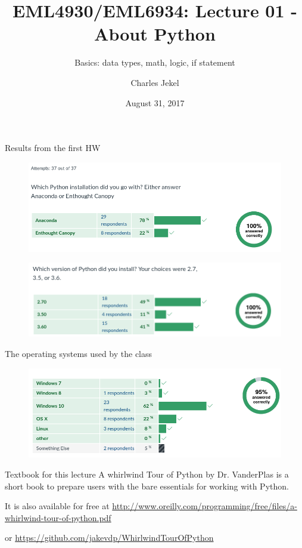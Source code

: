 \documentclass[10pt]{beamer}
\title{EML4930/EML6934: Lecture 01 - About Python }
\subtitle{Basics: data types, math, logic, if statement}
\date{August 31, 2017}
\author{Charles Jekel}
\begin{document}
\maketitle

\begin{frame}{Results from the first HW}
\begin{figure}
 	\includegraphics[width=1.0\textwidth]{figs/1.png}
\end{figure}
\begin{figure}
 	\includegraphics[width=1.0\textwidth]{figs/2.png}
\end{figure}

\end{frame}

\begin{frame}{The operating systems used by the class}
\begin{figure}
 	\includegraphics[width=1.0\textwidth]{figs/3.png}
\end{figure}
\end{frame}

\begin{frame}{Textbook for this lecture}
A whirlwind Tour of Python by Dr. VanderPlas is a short book to prepare users with the bare essentials
for working with Python. 

It is also available for free at
 \url{http://www.oreilly.com/programming/free/files/a-whirlwind-tour-of-python.pdf}
 
 or \url{https://github.com/jakevdp/WhirlwindTourOfPython}
  
\end{frame}
\end{document}
